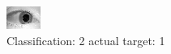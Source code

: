 \begin{figure}[h!]
\begin{center}
\includegraphics[width=0.60\columnwidth]{figures/ID1433_class_2_target_1.png}
\end{center}
\caption{ Classification: 2 actual target: 1}
\label{fig:ID1433_class_2_target_1}
\end{figure}
